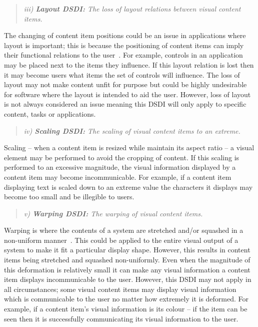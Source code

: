 \documentclass{bmcart}
\begin{document}
\begin{quote}\emph{iii) \textbf{Layout \ac{DSDI}:} The loss of layout relations between visual content items.}\end{quote}

The changing of content item positions could be an issue in applications where layout is important; this is because the positioning of content items can imply their functional relations to the user~\cite{Constantine1999}.
For example, controls in an application may be placed next to the items they influence.
If this layout relation is lost then it may become users what items the set of controls will influence. 
The loss of layout may not make content unfit for purpose but could be highly undesirable for software where the layout is intended to aid the user.
However, loss of layout is not always considered an issue meaning this \ac{DSDI} will only apply to specific content, tasks or applications.

\begin{quote}\emph{iv) \textbf{Scaling \ac{DSDI}:} The scaling of visual content items to an extreme.}\end{quote}

Scaling -- when a content item is resized while maintain its aspect ratio -- a visual element may be performed to avoid the cropping of content.
If this scaling is performed to an excessive magnitude, the visual information displayed by a content item may become incommunicable.
For example, if a content item displaying text is scaled down to an extreme value the characters it displays may become too small and be illegible to users.

\begin{quote}\emph{v) \textbf{Warping \ac{DSDI}:} The warping of visual content items.}\end{quote}

Warping is where the contents of a system are stretched and/or squashed in a non-uniform manner~\cite{Milliron2002}.
This could be applied to the entire visual output of a system to make it fit a particular display shape.
However, this results in content items being stretched and squashed non-uniformly.
Even when the magnitude of this deformation is relatively small it can make any visual information a content item displays incommunicable to the user.
However, this \ac{DSDI} may not apply in all circumstances; some visual content items may display visual information which is communicable to the user no matter how extremely it is deformed.
For example, if a content item's visual information is its colour -- if the item can be seen then it is successfully communicating its visual information to the user.
\end{document}
